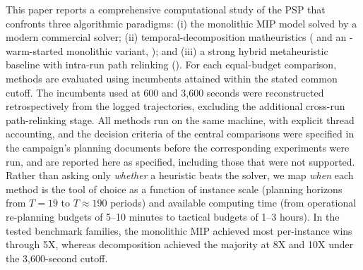 This paper reports a comprehensive computational study of the PSP that
confronts three algorithmic paradigms: (i) the monolithic MIP model solved by a modern commercial
solver; (ii) temporal-decomposition matheuristics (\RFFO{} and an
\RF-warm-started monolithic variant, \RFMIP); and (iii) a
strong hybrid metaheuristic baseline with intra-run path relinking
(\ILS). For each equal-budget comparison, methods are evaluated using
incumbents attained within the stated common cutoff. The \ILS{}
incumbents used at 600 and 3{,}600 seconds were reconstructed
retrospectively from the logged trajectories, excluding the additional
cross-run path-relinking stage. All methods run on the same machine,
with explicit thread accounting, and the decision criteria of the central comparisons were
specified in the campaign's planning documents before the
corresponding experiments were run, and are reported here as
specified, including those that were not supported.
Rather than asking only \emph{whether} a heuristic beats the solver,
we map \emph{when} each method is the tool of choice as a function of
instance scale (planning horizons from $T\!=\!19$ to $T\!\approx\!190$
periods) and available computing time (from operational re-planning
budgets of 5--10 minutes to tactical budgets of 1--3 hours).
In the tested benchmark families, the monolithic MIP achieved most
per-instance wins through 5X, whereas decomposition achieved the
majority at 8X and 10X under the 3{,}600-second cutoff.

